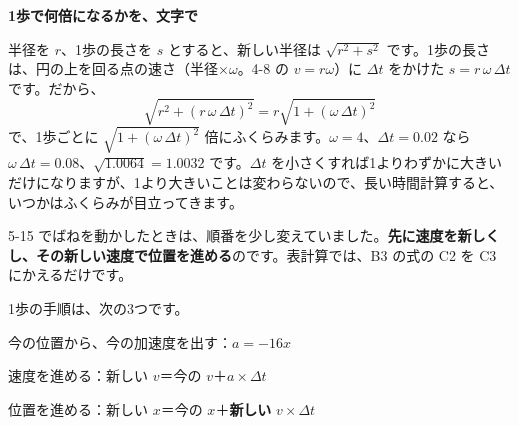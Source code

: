 \begin{motto}[3]
\textbf{1歩で何倍になるかを、文字で}\par
半径を $r$、1歩の長さを $s$ とすると、新しい半径は $\sqrt{r^2+s^2}$ です。1歩の長さは、円の上を回る点の速さ（半径×$\omega$。4-8 の $v=r\omega$）に $\Delta t$ をかけた $s=r\,\omega\,\Delta t$ です。だから、
\[ \sqrt{r^2+(r\,\omega\,\Delta t)^2}=r\sqrt{1+(\omega\,\Delta t)^2} \]
で、1歩ごとに $\sqrt{1+(\omega\,\Delta t)^2}$ 倍にふくらみます。$\omega=4$、$\Delta t=0.02$ なら $\omega\,\Delta t=0.08$、$\sqrt{1.0064}=1.0032$ です。$\Delta t$ を小さくすれば1よりわずかに大きいだけになりますが、1より大きいことは変わらないので、長い時間計算すると、いつかはふくらみが目立ってきます。
\end{motto}


\label{bk:6-2:saki}5-15 でばねを動かしたときは、順番を少し変えていました。\textbf{先に速度を新しくし、その新しい速度で位置を進める}のです。表計算では、B3 の式の C2 を C3 にかえるだけです。

\begin{bkcenter}
\end{bkcenter}
1歩の手順は、次の3つです。
\begin{enumerate}[label={\bkcircled[\bkTF]{\arabic*}}, leftmargin=2.4\zw, itemsep=1pt, topsep=2pt]
\item 今の位置から、今の加速度を出す：$a=-16x$
\item 速度を進める：新しい $v$＝今の $v$＋$a\times\Delta t$
\item 位置を進める：新しい $x$＝今の $x$＋\textbf{新しい} $v\times\Delta t$
\end{enumerate}

